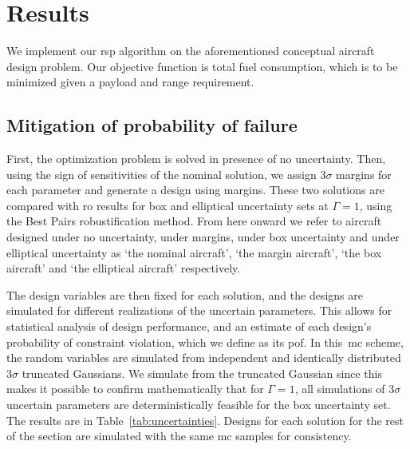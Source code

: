 \section{Results}

We implement our \gls{rsp} algorithm on the aforementioned conceptual aircraft design problem.
Our objective function is total fuel consumption, which is
to be minimized given a payload and range requirement.

\subsection{Mitigation of probability of failure}

First, the optimization problem is solved in presence of no uncertainty. Then, using the sign of
sensitivities of the nominal solution, we assign $3\sigma$ margins for each parameter
and generate a design using margins. These two solutions are compared with \gls{ro} results for
box and elliptical uncertainty sets at $\Gamma = 1$, using the Best Pairs robustification method.
From here onward we refer to
aircraft designed under no uncertainty, under margins, under box uncertainty and
under elliptical uncertainty as `the nominal aircraft',
`the margin aircraft', `the box aircraft' and `the elliptical aircraft' respectively.

The design variables are then fixed for each solution, and the designs are simulated for
different realizations of the uncertain parameters.
This allows for statistical analysis of design performance, and
an estimate of each design's probability of constraint
violation, which we define as its \gls{pof}.
In this~\gls{mc} scheme, the random variables
are simulated from independent and identically distributed $3\sigma$ truncated Gaussians.
We simulate from the truncated Gaussian since this makes it possible to
confirm mathematically that for $\Gamma = 1$, all simulations of $3\sigma$ uncertain parameters are
deterministically feasible for the box uncertainty set. The results are in Table~\ref{tab:uncertainties}.
Designs for each solution for the rest of the section
are simulated with the same \gls{mc} samples for consistency.

